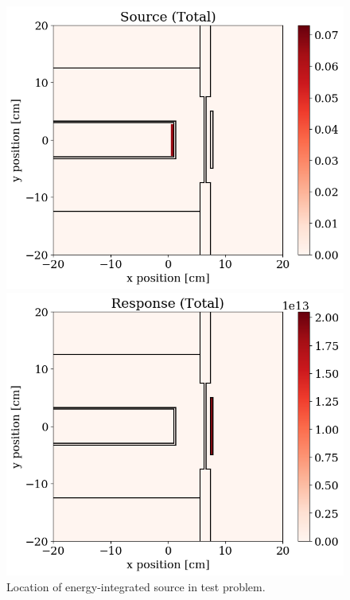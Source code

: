 \begin{figure}
  \centering
  \begin{minipage}{0.495\linewidth}
    \centering
    \includegraphics[width=\linewidth]{content/testprob/source_total.png}
    \caption{Location of energy-integrated source in test problem.}
    \label{fig:tp:source_total}
  \end{minipage}
  \hfill
  \begin{minipage}{0.495\linewidth}
    \centering
    \includegraphics[width=\linewidth]{content/testprob/response_total.png}

\end{minipage}
\end{figure}

